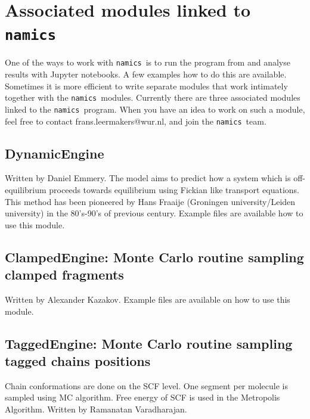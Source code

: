 \documentclass{article}
\newcommand{\namics}{{\tt namics}}
\begin{document}
\section{Associated modules linked to \namics\ }

One of the ways to work with \namics\ is to run the program from and analyse results with Jupyter notebooks. A few examples how to do this are available. 
Sometimes it is more efficient to write separate modules that work intimately together with the \namics\ modules. Currently there are three associated modules linked to the \namics\ program. When you have an idea to work on such a module, feel free to contact frans.leermakers@wur.nl, and join the \namics\ team. 

\subsection {DynamicEngine} Written by Daniel Emmery. The model aims to predict how a system which is off-equilibrium proceeds towards equilibrium using Fickian like transport equations. This method has been pioneered by Hans Fraaije (Groningen university/Leiden university) in the 80's-90's of previous century. Example files are available how to use this module. 

\subsection {ClampedEngine: Monte Carlo routine sampling clamped fragments}  Written by Alexander Kazakov. Example files are available on how to use this module.

\subsection {TaggedEngine: Monte Carlo routine sampling tagged chains positions} Chain conformations are done on the SCF level. One segment per molecule is sampled using MC algorithm. Free energy of SCF is used in the Metropolis Algorithm.  Written by Ramanatan Varadharajan.
\end{document}
